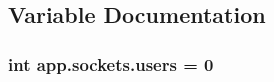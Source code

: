 \subsection{Variable Documentation}
\subsubsection[{\texorpdfstring{users}{users}}]{\setlength{\rightskip}{0pt plus 5cm}int app.\+sockets.\+users = 0}\hypertarget{namespaceapp_1_1sockets_afd959a0ffb7e2ec366c577798a5a3983}{}\label{namespaceapp_1_1sockets_afd959a0ffb7e2ec366c577798a5a3983}

